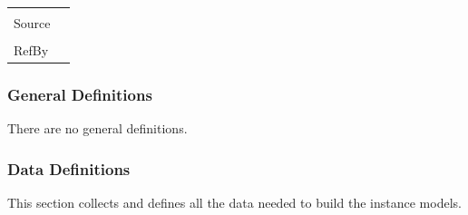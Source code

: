 \documentclass[12pt]{article}
\begin{document}
\begin{minipage}{\textwidth}
\begin{tabular}{>{\raggedright}p{}>{\raggedright\arraybackslash}p{}}
\\ \midrule \\
Source & \cite{lund2023}
         
\\ \midrule \\
RefBy & 
\\ \bottomrule
\end{tabular}
\end{minipage}
\subsubsection{General Definitions}
\label{Sec:GDs}
There are no general definitions.

\subsubsection{Data Definitions}
\label{Sec:DDs}
This section collects and defines all the data needed to build the instance models.
\end{document}
